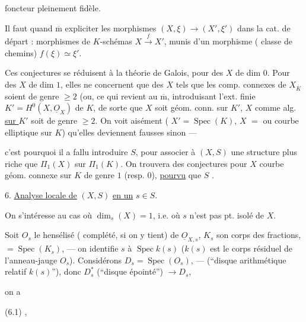 foncteur pleinement fidèle.

Il faut quand $\overline{\mathrm m}$ expliciter les
morphismes $(X,\xi)\longrightarrow(X',\xi')$ dans la cat. de départ :
morphismes de $K$-schémas $X\xrightarrow{f}X'$, munis d'un morphisme
 ( classe de chemins)
 $f(\xi)\simeq\xi'$.

Ces conjectures se réduisent à la théorie de Galois, pour des $X$ de
 dim $0$. Pour des $X$ de dim $1$, elles ne concernent que des $X$ tels
que les comp. connexes de $X_{\overline K}$ soient de genre $\geq 2$
(ou, ce qui revient au $\overline{\mathrm m}$, introduisant
l'ext. finie $K'=H^0(X,\underline{O}_X)$ de $K$, de sorte que $X$ soit
géom. conn. sur $K'$,  $X$ comme
  alg.
\uline{sur $K'$} soit de genre $\geq 2$. On voit aisément
( $X'=\operatorname{Spec}(K)$,
$X$  $=$
 ou courbe elliptique sur $K$)
qu'elles deviennent fausses sinon ---


c'est pourquoi il a fallu introduire $S$,
pour associer à $(X,S)$ une structure plus riche que $\Pi_1(X)$ sur
$\Pi_1(K)$. On trouvera des conjectures 
pour $X$  courbe géom. connexe sur $K$ de genre
$1$ (resp. $0$),
\uline{pourvu} que $S$
.

6. \uline{Analyse locale de} $(X,S)$ \uline{en un} $s\in S$.

On s'intéresse au cas où $\dim_s(X)=1$, i.e. où $s$ n'est pas pt.
isolé de $X$.

Soit $O_s$ le hensélisé ( complété, si on y tient)
de $\underline{O}_{X,s}$, $K_s$ son corps des fractions,
$=\operatorname{Spec}(K_s)$, --- on identifie $s$ à
$\operatorname{Spec} k(s)$ ($k(s)$ est le corps résiduel de
l'anneau-jauge $O_s$). Considérons
$D_s=\operatorname{Spec}(O_s)$, ---
(``disque arithmétique relatif  $k(s)$''), donc
$D_s^*$ 
(``disque épointé'') $\longrightarrow D_s$,


on a

(6.1)
,

